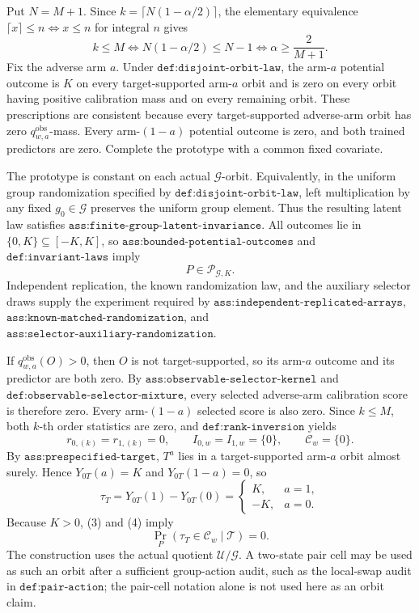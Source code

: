 Put \(N=M+1\). Since \(k=\lceil N(1-\alpha/2)\rceil\), the elementary equivalence \(\lceil x\rceil\le n\Longleftrightarrow x\le n\) for integral \(n\) gives
\[
k\le M
\Longleftrightarrow
N(1-\alpha/2)\le N-1
\Longleftrightarrow
\alpha\ge \frac{2}{M+1}.
\tag{1}
\]
Fix the adverse arm \(a\). Under \(\texttt{def:disjoint-orbit-law}\), the arm-\(a\) potential outcome is \(K\) on every target-supported arm-\(a\) orbit and is zero on every orbit having positive calibration mass and on every remaining orbit. These prescriptions are consistent because every target-supported adverse-arm orbit has zero \(q^{\mathrm{obs}}_{w,a}\)-mass. Every arm-\((1-a)\) potential outcome is zero, and both trained predictors are zero. Complete the prototype with a common fixed covariate.

The prototype is constant on each actual \(\mathcal G\)-orbit. Equivalently, in the uniform group randomization specified by \(\texttt{def:disjoint-orbit-law}\), left multiplication by any fixed \(g_0\in\mathcal G\) preserves the uniform group element. Thus the resulting latent law satisfies \(\texttt{ass:finite-group-latent-invariance}\). All outcomes lie in \(\{0,K\}\subseteq[-K,K]\), so \(\texttt{ass:bounded-potential-outcomes}\) and \(\texttt{def:invariant-laws}\) imply
\[
P\in\mathcal P_{\mathcal G,K}.
\tag{2}
\]
Independent replication, the known randomization law, and the auxiliary selector draws supply the experiment required by \(\texttt{ass:independent-replicated-arrays}\), \(\texttt{ass:known-matched-randomization}\), and \(\texttt{ass:selector-auxiliary-randomization}\).

If \(q^{\mathrm{obs}}_{w,a}(O)>0\), then \(O\) is not target-supported, so its arm-\(a\) outcome and its predictor are both zero. By \(\texttt{ass:observable-selector-kernel}\) and \(\texttt{def:observable-selector-mixture}\), every selected adverse-arm calibration score is therefore zero. Every arm-\((1-a)\) selected score is also zero. Since \(k\le M\), both \(k\)-th order statistics are zero, and \(\texttt{def:rank-inversion}\) yields
\[
r_{0,(k)}=r_{1,(k)}=0,\qquad
I_{0,w}=I_{1,w}=\{0\},\qquad
\mathcal C_w=\{0\}.
\tag{3}
\]
By \(\texttt{ass:prespecified-target}\), \(T^a\) lies in a target-supported arm-\(a\) orbit almost surely. Hence \(Y_{0T}(a)=K\) and \(Y_{0T}(1-a)=0\), so
\[
\tau_T
=
Y_{0T}(1)-Y_{0T}(0)
=
\begin{cases}
K,&a=1,\\
-K,&a=0.
\end{cases}
\tag{4}
\]
Because \(K>0\), (3) and (4) imply
\[
\Pr_P(\tau_T\in\mathcal C_w\mid\mathcal T)=0.
\]
The construction uses the actual quotient \(\mathcal U/\mathcal G\). A two-state pair cell may be used as such an orbit after a sufficient group-action audit, such as the local-swap audit in \(\texttt{def:pair-action}\); the pair-cell notation alone is not used here as an orbit claim.